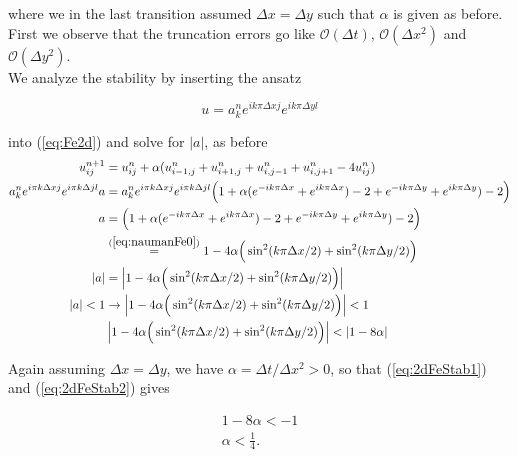 \documentclass{article}
\begin{document}
where we in the last transition assumed $\Delta x = \Delta y$ such that $\alpha$ is given as before.\\

First we observe that the truncation errors go like $\mathcal{O}(\Delta t)$, $\mathcal{O}(\Delta x^2)$ and $\mathcal{O}(\Delta y^2)$.\\

We analyze the stability by inserting the ansatz

\begin{equation}\label{eq:ansatz2d}
	u = a_k^n e^{i k \pi \Delta x j} e^{i k \pi \Delta y l}
\end{equation}

into (\ref{eq:Fe2d}) and solve for $|a|$, as before\\

\begin{subequations}
	\begin{align}
		u_{ij}^{n+1} &= u_{ij}^{n} + \alpha (u_{i-1,j}^n + u_{i+1,j}^n + u_{i,j-1}^n + u_{i,j+1}^n - 4u_{ij}^n)\\
		a_k^n e^{i \pi k \Delta x j} e^{i \pi k \Delta j l} a&= 
		a_k^n e^{i \pi k \Delta x j} e^{i \pi k \Delta j l} 
		\Big(1 + \alpha(e^{-i k \pi \Delta x} + e^{i k \pi \Delta x})  - 2 + e^{-i k \pi \Delta y} + e^{i k \pi \Delta y})  - 2\Big)\\
		a&= 
		\Big(1 + \alpha(e^{-i k \pi \Delta x} + e^{i k \pi \Delta x})  - 2 + e^{-i k \pi \Delta y} + e^{i k \pi \Delta y})  - 2\Big)\\
		&\stackrel{(\ref{eq:naumanFe0})}{=}
		1 - 4 \alpha \Big(\sin^2 (k \pi \Delta x /2) + \sin^2(k \pi \Delta y/2)\Big)\\
		|a| &=
		\left|1 - 4 \alpha \Big(\sin^2 (k \pi \Delta x /2) + \sin^2(k \pi \Delta y/2)\Big)\right|\\
		|a| < 1 &\rightarrow 		\left|1 - 4 \alpha \Big(\sin^2 (k \pi \Delta x /2) + \sin^2(k \pi \Delta y/2)\Big)\right|  < 1\label{eq:2dFeStab1}\\
		&\left|1 - 4 \alpha \Big(\sin^2 (k \pi \Delta x /2) + \sin^2(k \pi \Delta y/2)\Big)\right| < \left|1 - 8 \alpha \right|\label{eq:2dFeStab2}
	\end{align}
\end{subequations}

Again assuming $\Delta x = \Delta y$, we have $\alpha = \Delta t/\Delta x^2 > 0$, so that (\ref{eq:2dFeStab1}) and (\ref{eq:2dFeStab2}) gives

\begin{subequations}
	\begin{align}
		1 - 8 \alpha < -1\\
		\alpha < \frac{1}{4}.\label{eq:2dFeStab}
	\end{align}
\end{subequations}
\end{document}

